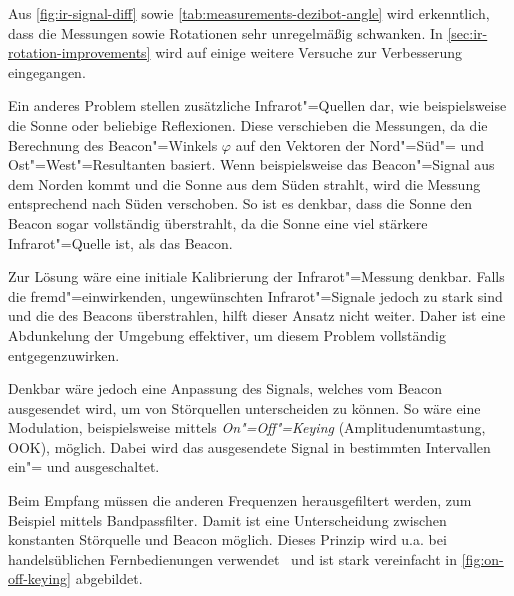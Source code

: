{Aus \autoref{fig:ir-signal-diff} sowie \autoref{tab:measurements-dezibot-angle} wird erkenntlich, dass die Messungen sowie Rotationen sehr unregelmäßig schwanken. In \autoref{sec:ir-rotation-improvements} wird auf einige weitere Versuche zur Verbesserung eingegangen.


Ein anderes Problem stellen zusätzliche Infrarot"=Quellen dar, wie beispielsweise die Sonne oder beliebige Reflexionen. Diese verschieben die Messungen, da die Berechnung des Beacon"=Winkels $\varphi$ auf den Vektoren der Nord"=Süd"= und Ost"=West"=Resultanten basiert. Wenn beispielsweise das Beacon"=Signal aus dem Norden kommt und die Sonne aus dem Süden strahlt, wird die Messung entsprechend nach Süden verschoben. So ist es denkbar, dass die Sonne den Beacon sogar vollständig überstrahlt, da die Sonne eine viel stärkere Infrarot"=Quelle ist, als das Beacon.

Zur Lösung wäre eine initiale Kalibrierung der Infrarot"=Messung denkbar. Falls die fremd"=einwirkenden, ungewünschten Infrarot"=Signale jedoch zu stark sind und die des Beacons überstrahlen, hilft dieser Ansatz nicht weiter. Daher ist eine Abdunkelung der Umgebung effektiver, um diesem Problem vollständig entgegenzuwirken.

Denkbar wäre jedoch eine Anpassung des Signals, welches vom Beacon ausgesendet wird, um von Störquellen unterscheiden zu können. So wäre eine Modulation, beispielsweise mittels \emph{On"=Off"=Keying} (Amplitudenumtastung, OOK), möglich. Dabei wird das ausgesendete Signal in bestimmten Intervallen ein"= und ausgeschaltet. 

Beim Empfang müssen die anderen Frequenzen herausgefiltert werden, zum Beispiel mittels Bandpassfilter. Damit ist eine Unterscheidung zwischen konstanten Störquelle und Beacon möglich. Dieses Prinzip wird u.a. bei handelsüblichen Fernbedienungen verwendet~\cite{ewaldIRFernbedienungen2019} und ist stark vereinfacht in \autoref{fig:on-off-keying} abgebildet.

}
